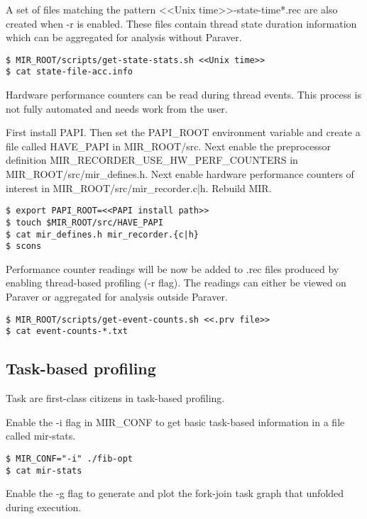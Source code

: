 \documentclass[11pt,a4paper,notitlepage]{article}
\begin{document}
A set of files matching the pattern <<Unix time>>-state-time*.rec are also created when -r is enabled. 
These files contain thread state duration information which can be aggregated for analysis without Paraver.

\begin{lstlisting}[style=BashInputStyle]
$ MIR_ROOT/scripts/get-state-stats.sh <<Unix time>>
$ cat state-file-acc.info
\end{lstlisting}

Hardware performance counters can be read during thread events. This process is not fully automated and needs work from the user.

First install PAPI. 
Then set the PAPI\_ROOT environment variable and create a file called HAVE\_PAPI in MIR\_ROOT/src.
Next enable the preprocessor definition MIR\_RECORDER\_USE\_HW\_PERF\_COUNTERS in MIR\_ROOT/src/mir\_defines.h.
Next enable hardware performance counters of interest in MIR\_ROOT/src/mir\_recorder.{c|h}.
Rebuild MIR.

\begin{lstlisting}[style=BashInputStyle]
$ export PAPI_ROOT=<<PAPI install path>>
$ touch $MIR_ROOT/src/HAVE_PAPI
$ cat mir_defines.h mir_recorder.{c|h}
$ scons
\end{lstlisting}

Performance counter readings will be now be added to .rec files produced by enabling thread-based profiling (-r flag). 
The readings can either be viewed on Paraver or aggregated for analysis outside Paraver. 

\begin{lstlisting}[style=BashInputStyle]
$ MIR_ROOT/scripts/get-event-counts.sh <<.prv file>>
$ cat event-counts-*.txt
\end{lstlisting}

\subsection{Task-based profiling}
Task are first-class citizens in task-based profiling.

Enable the -i flag in MIR\_CONF to get basic task-based information in a file called mir-stats.

\begin{lstlisting}[style=BashInputStyle]
$ MIR_CONF="-i" ./fib-opt
$ cat mir-stats
\end{lstlisting}

Enable the -g flag to generate and plot the fork-join task graph that unfolded during execution.
\end{document}
